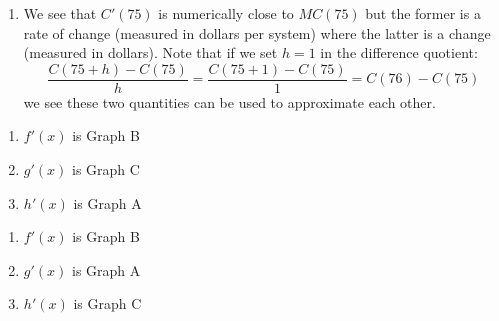 \begin{enumerate}
\begin{enumerate}
\item  We see that $C'(75)$ is numerically close to $MC(75)$ but the former is a rate of change (measured in dollars per system) where the latter is a change (measured in dollars).  Note that if we set  $h = 1$ in the difference quotient:  \[\dfrac{C(75+h) - C(75)}{h} = \dfrac{C(75+1) - C(75)}{1} = C(76) - C(75)\] we see these two quantities can be used to approximate each other.

\end{enumerate}

\setcounter{HW}{\value{enumi}}
\end{enumerate}





\begin{multicols}{3}

\begin{enumerate}
\setcounter{enumi}{\value{HW}}

 \item $f'(x)$ is Graph B
 
 \item $g'(x)$ is Graph C
 
 
 \item $h'(x)$ is Graph A 

\setcounter{HW}{\value{enumi}}
\end{enumerate}

\end{multicols}


\begin{multicols}{3}

\begin{enumerate}
\setcounter{enumi}{\value{HW}}

 \item $f'(x)$ is Graph B
 
 \item $g'(x)$ is Graph A
 
 \item $h'(x)$ is Graph C

\setcounter{HW}{\value{enumi}}
\end{enumerate}

\end{multicols}




